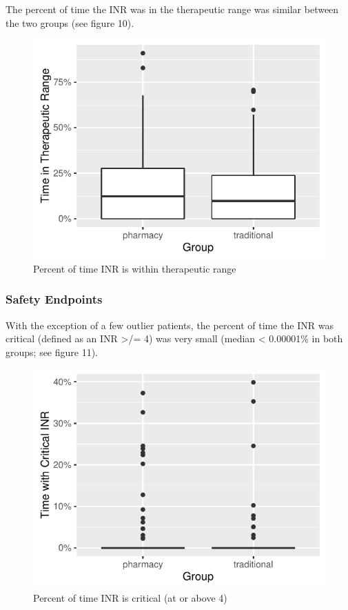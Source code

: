 \documentclass[]{article}
\begin{document}
The percent of time the INR was in the therapeutic range was similar
between the two groups (see figure 10).

\begin{figure}[H]
\centering
\includegraphics{warfarin_analysis_2015_files/figure-latex/ttr-1.pdf}
\caption{Percent of time INR is within therapeutic range}
\end{figure}

\subsubsection{Safety Endpoints}\label{safety-endpoints}

With the exception of a few outlier patients, the percent of time the
INR was critical (defined as an INR \textgreater{}/= 4) was very small
(median \textless{} 0.00001\% in both groups; see figure 11).

\begin{figure}[H]
\centering
\includegraphics{warfarin_analysis_2015_files/figure-latex/time_above4-1.pdf}
\caption{Percent of time INR is critical (at or above 4)}
\end{figure}
\end{document}

